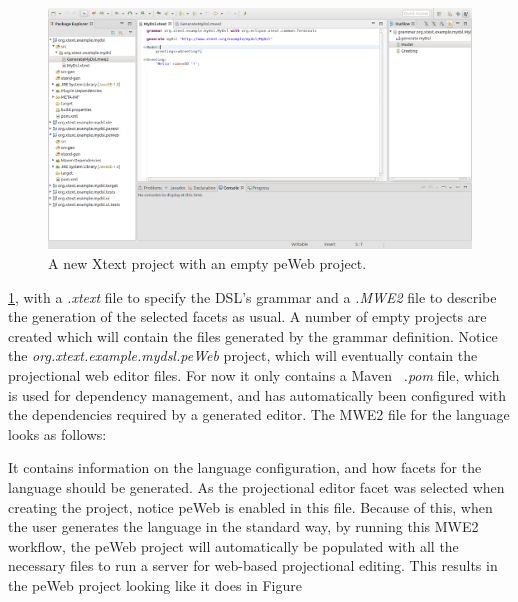 \documentclass{article}
\begin{document}
\begin{figure}[h!]
  \includegraphics[width=\linewidth]{./Screenshots/newProjectScreen.png}
  \caption{A new Xtext project with an empty peWeb project.}
  \label{fig:newProjectScreen}
\end{figure} \ref{fig:newProjectScreen}, with a \emph{.xtext} file to specify the DSL's grammar and a \emph{.MWE2} file to describe the generation of the selected facets as usual. A number of empty projects are created which will contain the files generated by the grammar definition. Notice the \emph{org.xtext.example.mydsl.peWeb} project, which will eventually contain the projectional web editor files. For now it only contains a Maven~\cite{maven} \emph{.pom} file, which is used for dependency management, and has automatically been configured with the dependencies required by a generated editor.\clearpage 
\noindent The MWE2 file for the language looks as follows:

It contains information on the language configuration, and how facets for the language should be generated. As the projectional editor facet was selected when creating the project, notice peWeb is enabled in this file. Because of this, when the user generates the language in the standard way, by running this MWE2 workflow, the peWeb project will automatically be populated with all the necessary files to run a server for web-based projectional editing. This results in the peWeb project looking like it does in Figure 
\end{document}
